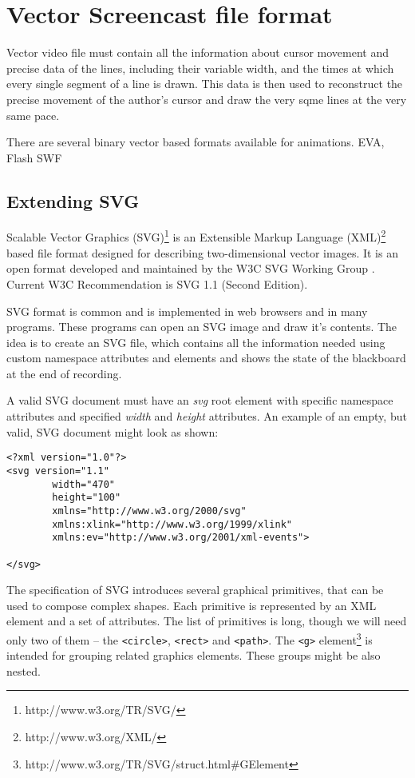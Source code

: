 \chapter{Vector Screencast file format}

Vector video file must contain all the information about cursor movement and precise data of the lines, including their variable width, and the times at which every single segment of a line is drawn. This data is then used to reconstruct the precise movement of the author's cursor and draw the very sqme lines at the very same pace.

There are several binary vector based formats available for animations. EVA, Flash SWF

\section{Extending SVG}
Scalable Vector Graphics (SVG)\footnote{http://www.w3.org/TR/SVG/} is an Extensible Markup Language (XML)\footnote{http://www.w3.org/XML/} based file format designed for describing two-dimensional vector images. It is an open format developed and maintained by the W3C SVG Working Group \cite{}. Current W3C Recommendation is SVG 1.1 (Second Edition).

SVG format is common and is implemented in web browsers and in many programs. These programs can open an SVG image and draw it's contents. The idea is to create an SVG file, which contains all the information needed using custom namespace attributes and elements and shows the state of the blackboard at the end of recording.

A valid SVG document must have an \textit{svg} root element with specific namespace attributes and specified \textit{width} and \textit{height} attributes. An example of an empty, but valid, SVG document might look as shown:

\begin{verbatim}
<?xml version="1.0"?>
<svg version="1.1"
        width="470"
        height="100"
        xmlns="http://www.w3.org/2000/svg"
        xmlns:xlink="http://www.w3.org/1999/xlink"
        xmlns:ev="http://www.w3.org/2001/xml-events">

</svg>
\end{verbatim}

The specification of SVG introduces several graphical primitives, that can be used to compose complex shapes. Each primitive is represented by an XML element and a set of attributes. The list of primitives is long, though we will need only two of them -- the \verb|<circle>|, \verb|<rect>| and \verb|<path>|. The \verb|<g>| element\footnote{http://www.w3.org/TR/SVG/struct.html\#GElement} is intended for grouping related graphics elements. These groups might be also nested.